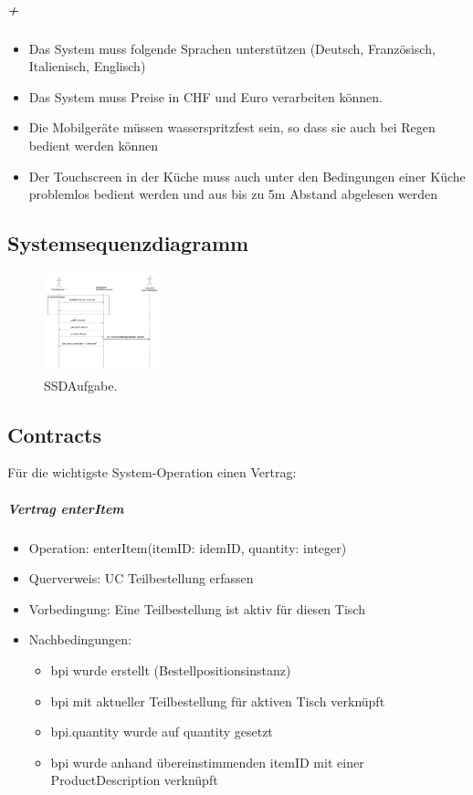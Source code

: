 \documentclass{article}
\begin{document}
\subparagraph{+\\}

\begin{itemize}
	\item Das System muss folgende Sprachen unterstützen (Deutsch, Französisch, Italienisch, 
Englisch)
	\item Das System muss Preise in CHF und Euro verarbeiten können.
	\item Die Mobilgeräte müssen wasserspritzfest sein, so dass sie auch bei Regen bedient werden können
	\item Der Touchscreen in der Küche muss auch unter den Bedingungen einer Küche problemlos bedient werden und aus bis zu 5m Abstand abgelesen werden
\end{itemize}


\subsection{Systemsequenzdiagramm}

\begin{figure}[H]
\centering
\includegraphics[width=0.3\textwidth]{Resources/Images/SSDAufgabe.png}
\caption{\label{fig:SSDAufgab}SSDAufgabe.}
\end{figure}


\subsection{Contracts}

Für die wichtigste System-Operation einen Vertrag: \\

\subparagraph{Vertrag enterItem \\}

\begin{itemize}
	\item Operation: enterItem(itemID: idemID, quantity: integer)
	\item Querverweis: UC Teilbestellung erfassen
	\item Vorbedingung: Eine Teilbestellung ist aktiv für diesen Tisch
	\item Nachbedingungen:
	\begin{itemize}
		\item bpi wurde erstellt (Bestellpositionsinstanz)
		\item bpi mit aktueller Teilbestellung für aktiven Tisch verknüpft
		\item bpi.quantity wurde auf quantity gesetzt
		\item bpi wurde anhand übereinstimmenden itemID mit einer ProductDescription verknüpft 
	\end{itemize}
\end{itemize}
\end{document}

